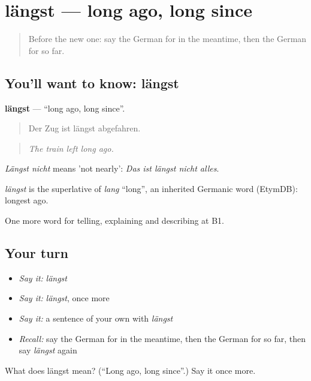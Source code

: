 \section[längst]{längst — long ago, long since}

\label{lesson:GE-C265-laengst}



\begin{quote}
Before the new one: say the German for in the meantime, then the German for so far.
\end{quote}

\subsection*{You'll want to know: längst}
\textbf{längst} — \textquotedblleft{}long ago, long since\textquotedblright{}.

\begin{quote}
Der Zug ist längst abgefahren.
\end{quote}

\begin{quote}
\emph{The train left long ago.}
\end{quote}

\emph{Längst nicht} means 'not nearly': \emph{Das ist längst nicht alles}.

\begin{cousinweb}
\emph{längst} is the superlative of \emph{lang} \textquotedblleft{}long\textquotedblright{}, an inherited Germanic word (EtymDB): longest ago.
\end{cousinweb}

\begin{grammarlens}[title={What you've built}]
One more word for telling, explaining and describing at B1.
\end{grammarlens}

\subsection*{Your turn}
\begin{itemize}
\raggedright
  \item \emph{Say it:} \emph{längst}
  \item \emph{Say it:} \emph{längst}, once more
  \item \emph{Say it:} a sentence of your own with \emph{längst}
  \item \emph{Recall:} say the German for in the meantime, then the German for so far, then say \emph{längst} again
\end{itemize}

\begin{tcolorbox}[breakable,colback=teal!4,colframe=teal!35!black,title={Before you move on}]
What does längst mean? (\textquotedblleft{}Long ago, long since\textquotedblright{}.) Say it once more.
\end{tcolorbox}
